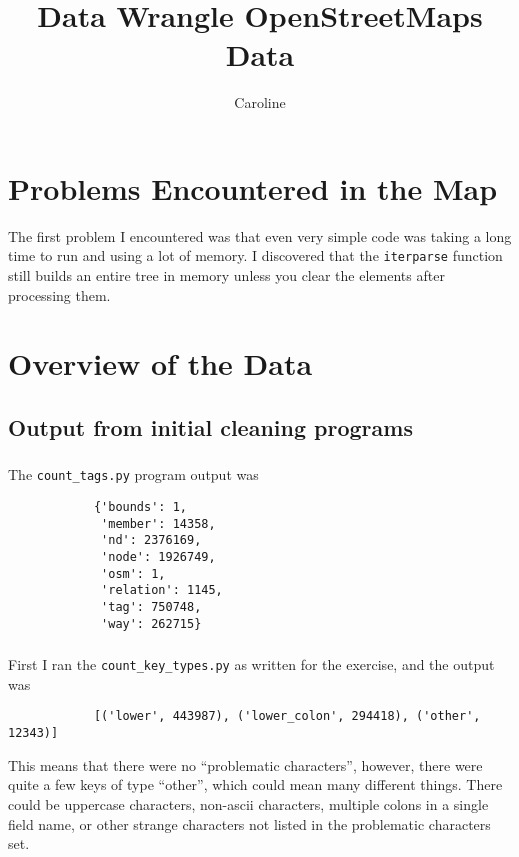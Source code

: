 \documentclass{article}
\author{Caroline}
\title{Data Wrangle OpenStreetMaps Data}
\begin{document}
    \maketitle
    \section{Problems Encountered in the Map}
        The first problem I encountered was that even very simple code was
        taking a long time to run and using a lot of memory. I discovered that
        the \texttt{iterparse} function still builds an entire tree in memory unless
        you clear the elements after processing them.
    \section{Overview of the Data}
        \subsection{Output from initial cleaning programs}
            \subsubsection{}
            The \texttt{count\_tags.py} program output was
            \begin{lstlisting}
            {'bounds': 1,
             'member': 14358,
             'nd': 2376169,
             'node': 1926749,
             'osm': 1,
             'relation': 1145,
             'tag': 750748,
             'way': 262715}
            \end{lstlisting}

            \subsubsection{}
            First I ran the \texttt{count\_key\_types.py} as written for the
            exercise, and the output was
            \begin{lstlisting}
            [('lower', 443987), ('lower_colon', 294418), ('other', 12343)]
            \end{lstlisting}
            This means that there were no ``problematic characters'', however,
            there were quite a few keys of type ``other'', which could mean many
            different things. There could be uppercase characters, non-ascii
            characters, multiple colons in a single field name, or other strange
            characters not listed in the problematic characters set.
\end{document}
